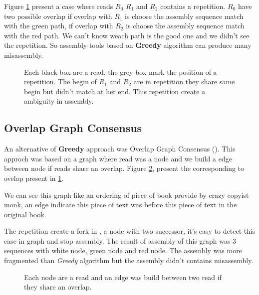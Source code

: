 \documentclass[./main.tex]{subfiles}
\begin{document}
Figure \ref{intro:fig:greedy:repetition} present a case where reads $R_0$ $R_1$ and $R_2$ contains a repetition. $R_0$ have two possible overlap if overlap with $R_1$ is choose the assembly sequence match with the green path, if overlap with $R_2$ is choose the assembly sequence match with the red path. We can't know weach path is the good one and we didn't see the repetition. So assembly tools based on \textbf{Greedy} algorithm can produce many misassembly. 

\begin{figure}[ht]
    \centering 
    
    \caption{Each black box are a read, the grey box mark the position of a repetition. The begin of $R_1$ and $R_2$ are in repetition they share same begin but didn't match at her end. This repetition create a ambiguity in assembly.}
    \label{intro:fig:greedy:repetition}
\end{figure}

\subsection{Overlap Graph Consensus}


An alternative of \textbf{Greedy} approach was Overlap Graph Consensus (\OLC). This approch was based on a graph where read was a node and we build a edge between node if reads share an overlap. Figure \ref{intro:fig:olc:graph}, present the \OLC corresponding to ovelap present in \ref{intro:fig:greedy:repetition}.

We can see this graph like an ordering of piece of book provide by crazy copyist monk, an edge indicate this piece of text was before this piece of text in the original book.

The repetition create a fork in \OLC, a node with two successor, it's easy to detect this case in graph and stop assembly. The result of assembly of this graph was 3 sequences with white node, green node and red node. The assembly was more fragmented than \textit{Greedy} algorithm but the assembly didn't contains misassembly.

\begin{figure}[ht]
    \centering 
    
    \caption{Each node are a read and an edge was build between two read if they share an overlap.}
    \label{intro:fig:olc:graph}
\end{figure}
\end{document}
